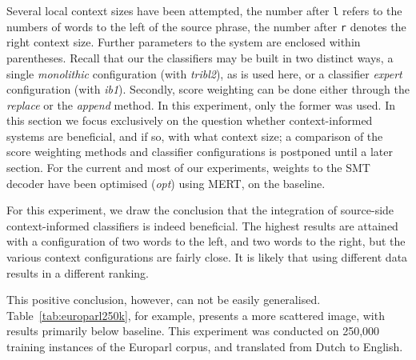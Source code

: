 \documentclass[smallextended]{svjour3}       %
\theoremstyle{break}
\begin{document}
Several local context sizes have been attempted, the number after \texttt{l}
refers to the numbers of words to the left of the source phrase, the number
after \texttt{r} denotes the right context size. Further parameters to the
system are enclosed within parentheses.  Recall that our the classifiers may be
built in two distinct ways, a single \emph{monolithic} configuration (with
\emph{tribl2}), as is used here, or a classifier \emph{expert} configuration
(with \emph{ib1}).  Secondly, score weighting can be done either through the
\emph{replace} or the \emph{append} method. In this experiment, only the former
was used.  In this section we focus exclusively on the question whether
context-informed systems are beneficial, and if so, with what context size; a
comparison of the score weighting methods and classifier configurations is
postponed until a later section.  For the current and most of our experiments,
weights to the SMT decoder have been optimised (\emph{opt}) using MERT, on the
baseline.

For this experiment, we draw the conclusion that the integration of source-side
context-informed classifiers is indeed beneficial.  The highest results are
attained with a configuration of two words to the left, and two words to the
right, but the various context configurations are fairly close. It is likely
that using different data results in a different ranking.

This positive conclusion, however, can not be easily generalised.
Table~\ref{tab:europarl250k}, for example, presents a more scattered image,
with results primarily below baseline. This experiment was conducted on 250,000
training instances of the Europarl corpus, and translated from Dutch to
English.
\end{document}

